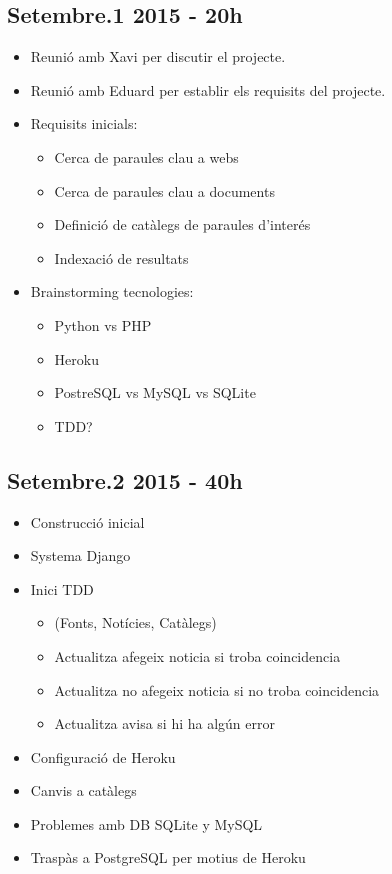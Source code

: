 \documentclass{article}
\begin{document}
\subsection{Setembre.1 2015 - 20h}

\begin{itemize}
    \item Reunió amb Xavi per discutir el projecte.
    \item Reunió amb Eduard per establir els requisits del projecte.
    \item Requisits inicials: 
    \begin{itemize}
        \item Cerca de paraules clau a webs
        \item Cerca de paraules clau a documents
        \item Definició de catàlegs de paraules d'interés
        \item Indexació de resultats
    \end{itemize}
    \item Brainstorming tecnologies:
    \begin{itemize}
        \item Python vs PHP
        \item Heroku
        \item PostreSQL vs MySQL vs SQLite
        \item TDD\@?
    \end{itemize}
\end{itemize}

\subsection{Setembre.2 2015 - 40h}

\begin{itemize}
    \item  Construcció inicial
    \item  Systema Django
    \item  Inici TDD 
	\begin{itemize}
	\item  (Fonts, Notícies, Catàlegs)
	\item  Actualitza afegeix noticia si troba coincidencia
	\item  Actualitza no afegeix noticia si no troba coincidencia
	\item  Actualitza avisa si hi ha algún error
	\end{itemize}
    \item  Configuració de Heroku
    \item  Canvis a catàlegs
    \item  Problemes amb DB SQLite y MySQL
    \item  Traspàs a PostgreSQL per motius de Heroku
\end{itemize}
\end{document}
